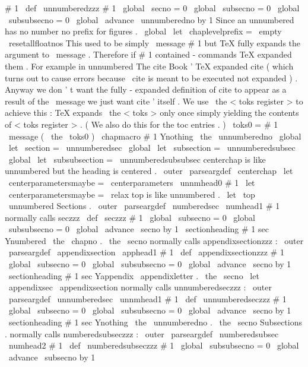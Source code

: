 {{{{{
#
1
}
}
\
def
\
unnumberedzzz
#
1
{
%
\
global
\
secno
=
0
\
global
\
subsecno
=
0
\
global
\
subsubsecno
=
0
\
global
\
advance
\
unnumberedno
by
1
%
%
Since
an
unnumbered
has
no
number
no
prefix
for
figures
.
\
global
\
let
\
chaplevelprefix
=
\
empty
\
resetallfloatnos
%
%
This
used
to
be
simply
\
message
{
#
1
}
but
TeX
fully
expands
the
%
argument
to
\
message
.
Therefore
if
#
1
contained
-
commands
TeX
%
expanded
them
.
For
example
in
unnumbered
The
cite
{
Book
}
'
TeX
%
expanded
cite
(
which
turns
out
to
cause
errors
because
\
cite
is
meant
%
to
be
executed
not
expanded
)
.
%
%
Anyway
we
don
'
t
want
the
fully
-
expanded
definition
of
cite
to
appear
%
as
a
result
of
the
\
message
we
just
want
cite
'
itself
.
We
use
%
\
the
<
toks
register
>
to
achieve
this
:
TeX
expands
\
the
<
toks
>
only
once
%
simply
yielding
the
contents
of
<
toks
register
>
.
(
We
also
do
this
for
%
the
toc
entries
.
)
\
toks0
=
{
#
1
}
%
\
message
{
(
\
the
\
toks0
)
}
%
%
\
chapmacro
{
#
1
}
{
Ynothing
}
{
\
the
\
unnumberedno
}
%
%
\
global
\
let
\
section
=
\
unnumberedsec
\
global
\
let
\
subsection
=
\
unnumberedsubsec
\
global
\
let
\
subsubsection
=
\
unnumberedsubsubsec
}
%
centerchap
is
like
unnumbered
but
the
heading
is
centered
.
\
outer
\
parseargdef
\
centerchap
{
%
\
let
\
centerparametersmaybe
=
\
centerparameters
\
unnmhead0
{
#
1
}
%
\
let
\
centerparametersmaybe
=
\
relax
}
%
top
is
like
unnumbered
.
\
let
\
top
\
unnumbered
%
Sections
.
%
\
outer
\
parseargdef
\
numberedsec
{
\
numhead1
{
#
1
}
}
%
normally
calls
seczzz
\
def
\
seczzz
#
1
{
%
\
global
\
subsecno
=
0
\
global
\
subsubsecno
=
0
\
global
\
advance
\
secno
by
1
\
sectionheading
{
#
1
}
{
sec
}
{
Ynumbered
}
{
\
the
\
chapno
.
\
the
\
secno
}
%
}
%
normally
calls
appendixsectionzzz
:
\
outer
\
parseargdef
\
appendixsection
{
\
apphead1
{
#
1
}
}
\
def
\
appendixsectionzzz
#
1
{
%
\
global
\
subsecno
=
0
\
global
\
subsubsecno
=
0
\
global
\
advance
\
secno
by
1
\
sectionheading
{
#
1
}
{
sec
}
{
Yappendix
}
{
\
appendixletter
.
\
the
\
secno
}
%
}
\
let
\
appendixsec
\
appendixsection
%
normally
calls
unnumberedseczzz
:
\
outer
\
parseargdef
\
unnumberedsec
{
\
unnmhead1
{
#
1
}
}
\
def
\
unnumberedseczzz
#
1
{
%
\
global
\
subsecno
=
0
\
global
\
subsubsecno
=
0
\
global
\
advance
\
secno
by
1
\
sectionheading
{
#
1
}
{
sec
}
{
Ynothing
}
{
\
the
\
unnumberedno
.
\
the
\
secno
}
%
}
%
Subsections
.
%
%
normally
calls
numberedsubseczzz
:
\
outer
\
parseargdef
\
numberedsubsec
{
\
numhead2
{
#
1
}
}
\
def
\
numberedsubseczzz
#
1
{
%
\
global
\
subsubsecno
=
0
\
global
\
advance
\
subsecno
by
1
}}}}
